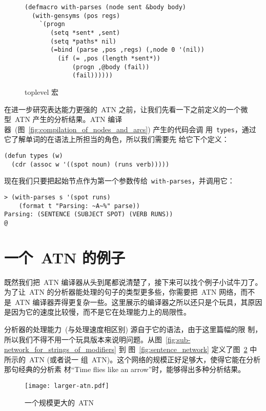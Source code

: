 \begin{figure}
\begin{lstlisting}
(defmacro with-parses (node sent &body body)
  (with-gensyms (pos regs)
    `(progn
       (setq *sent* ,sent)
       (setq *paths* nil)
       (=bind (parse ,pos ,regs) (,node 0 '(nil))
         (if (= ,pos (length *sent*))
             (progn ,@body (fail))
             (fail))))))
\end{lstlisting}
  \caption{toplevel 宏}
  \label{fig:atn:toplevel_macro}
\end{figure}

在进一步研究表达能力更强的~\textsc{ATN} 之前，让我们先看一下之前定义的一个微
型~\textsc{ATN} 产生的分析结果。\textsc{ATN} 编译
器~(图~\ref{fig:compilation_of_nodes_and_arcs}) 产生的代码会调
用~\texttt{types}，通过它了解单词的在语法上所担当的角色，所以我们需要先
给它下个定义：
\begin{lstlisting}
(defun types (w)
  (cdr (assoc w '((spot noun) (runs verb)))))
\end{lstlisting}

现在我们只要把起始节点作为第一个参数传给~\texttt{with-parses}，并调用它：
\begin{lstlisting}
> (with-parses s '(spot runs)
    (format t "Parsing: ~A~%" parse))
Parsing: (SENTENCE (SUBJECT SPOT) (VERB RUNS))
@
\end{lstlisting}

\section{一个~\textsc{ATN} 的例子}
\label{sec:a_sample_atn}

既然我们把~\textsc{ATN} 编译器从头到尾都说清楚了，接下来可以找个例子小试牛刀了。
为了让~\textsc{ATN} 的分析器能处理的句子的类型更多些，你需要把~\textsc{ATN} 网络，而不
是~\textsc{ATN} 编译器弄得更复杂一些。这里展示的编译器之所以还只是个玩具，其原因
是因为它的速度比较慢，而不是它在处理能力上的局限性。

分析器的处理能力~(与处理速度相区别) 源自于它的语法，由于这里篇幅的限
制，所以我们不得不用一个玩具版本来说明问题。从图~\ref{fig:sub-network_for_strings_of_modifiers} 到
图~\ref{fig:sentence_network} 定义了图~\ref{fig:graph_of_a_larger_atn} 中所示的~\textsc{ATN} (或者说一
组~\textsc{ATN})。这个网络的规模正好足够大，使得它能在分析那句经典的分析素
材``Time flies like an arrow''时，能够得出多种分析结果。

\begin{figure}
\begin{center}
\texttt{[image: larger-atn.pdf]}
\end{center}
  \caption{一个规模更大的~ATN}
  \label{fig:graph_of_a_larger_atn}
\end{figure}


